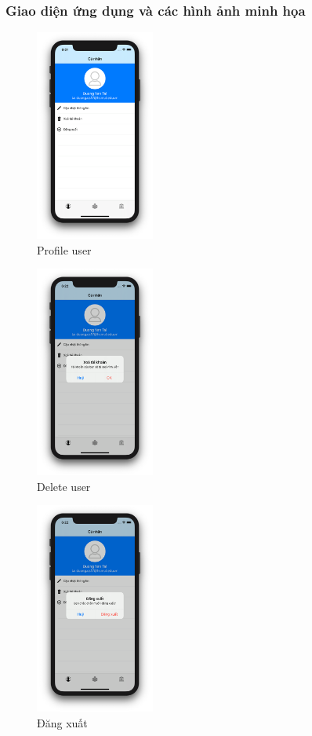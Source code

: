 \documentclass[12pt,a4paper,titlepage]{article}
\begin{document}
\subsubsection{Giao diện ứng dụng và các hình ảnh minh họa}
\begin{figure}[h!]
	\centering
	\caption{Profile user}
	\includegraphics[width=0.35\textwidth]{images/user1.png}
\end{figure}
\begin{figure}[h!]
	\centering
	\caption{Delete user}
	\includegraphics[width=0.35\textwidth]{images/user2.png}
\end{figure}
\newpage
\begin{figure}[h!]
	\centering
	\caption{Đăng xuất}
	\includegraphics[width=0.35\textwidth]{images/user3.png}
\end{figure}
\end{document}
